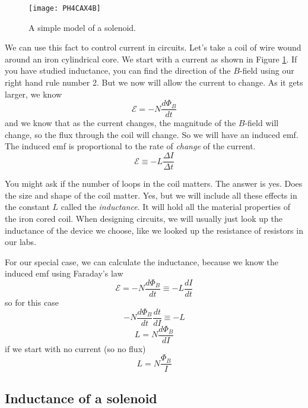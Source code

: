 \begin{figure}[htbp!]
	\centering
\texttt{[image: PH4CAX4B]}
	\caption{A simple model of a solenoid.}
	\label{fig:solenoid}
\end{figure}
We can use this fact to control current in circuits.
Let's take a coil of wire wound
around an iron cylindrical core. We start with a current as
shown in Figure \ref{fig:solenoid}. 
If you have studied inductance, you can find the
direction of the $B$-field using our right hand rule number 2. But we now
will allow the current to change. As it gets larger, we know 
\begin{equation*}
\mathcal{E}=-N\frac{d\Phi _{B}}{dt}
\end{equation*}
and we know that as the current changes, the magnitude of the $B$-field will
change, so the flux through the coil will change. So we will have an induced
emf. The induced emf is proportional to the rate of \emph{change} of the
current.%
\begin{equation*}
\mathcal{E}\equiv -L\frac{\Delta I}{\Delta t}
\end{equation*}

You might ask if the number of loops in the coil matters. The answer is yes.
Does the size and shape of the coil matter. Yes, but we will include all
these effects in the constant $L$ called the \emph{inductance}. It will hold
all the material properties of the iron cored coil. When designing
circuits, we will usually just look up the inductance of the device we
choose, like we looked up the resistance of resistors in our labs.

For our special case, we can calculate the inductance, because we know the
induced emf using Faraday's law%
\begin{equation*}
\mathcal{E}=-N\frac{d\Phi _{B}}{dt}\equiv -L\frac{dI}{dt}
\end{equation*}%
so for this case%
\begin{equation*}
-N\frac{d\Phi _{B}}{dt}\frac{dt}{dI}\equiv -L
\end{equation*}%
\begin{equation*}
L=N\frac{d\Phi _{B}}{dI}
\end{equation*}%
if we start with no current (so no flux)%
\begin{equation*}
L=N\frac{\Phi _{B}}{I}
\end{equation*}

\subsection{Inductance of a solenoid}

